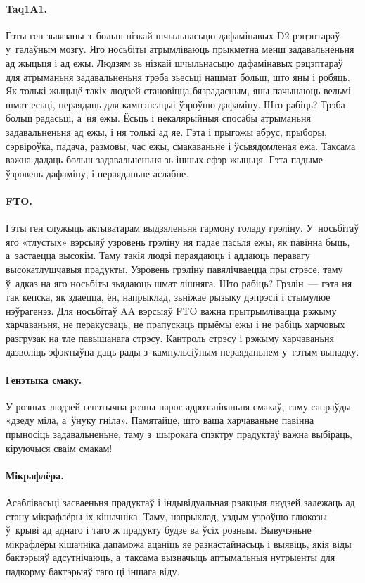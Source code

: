 \paragraph{Taq1A1.}
Гэты ген зьвязаны з~больш нізкай шчыльнасьцю дафамінавых D2 рэцэптараў у~галаўным мозгу. Яго носьбіты атрымліваюць прыкметна менш задавальненьня ад жыцьця і ад ежы. Людзям зь нізкай шчыльнасьцю дафамінавых рэцэптараў для атрыманьня задавальненьня трэба зьесьці нашмат больш, што яны і робяць. Як толькі жыцьцё такіх людзей становіцца бязрадасным, яны пачынаюць вельмі шмат есьці, пераядаць для кампэнсацыі ўзроўню дафаміну. Што рабіць? Трэба больш радасьці, а~ня ежы. Ёсьць і некалярыйныя спосабы атрыманьня задавальненьня ад ежы, і ня толькі ад яе. Гэта і прыгожы абрус, прыборы, сэрвіроўка, падача, размовы, час ежы, смакаваньне і ўсьвядомленая ежа. Таксама важна дадаць больш задавальненьня зь іншых сфэр жыцьця. Гэта падыме ўзровень дафаміну, і пераяданьне аслабне.

\paragraph{FTO.}
Гэты ген служыць актыватарам выдзяленьня гармону голаду грэліну. У~носьбітаў яго «тлустых» вэрсыяў узровень грэліну ня падае пасьля ежы, як павінна быць, а~застаецца высокім. Таму такія людзі пераядаюць і аддаюць перавагу высокатлушчавыя прадукты. Узровень грэліну павялічваецца пры стрэсе, таму ў~адказ на яго носьбіты зьядаюць шмат лішняга. Што рабіць? Грэлін~--- гэта ня так кепска, як здаецца, ён, напрыклад, зьніжае рызыку дэпрэсіі і стымулюе нэўрагенэз. Для носьбітаў AA вэрсыяў FTO важна прытрымлівацца рэжыму харчаваньня, не перакусваць, не прапускаць прыёмы ежы і не рабіць харчовых разгрузак на тле павышанага стрэсу. Кантроль стрэсу і рэжыму харчаваньня дазволіць эфэктыўна даць рады з~кампульсіўным пераяданьнем у~гэтым выпадку.

\paragraph{Генэтыка смаку.}
У розных людзей генэтычна розны парог адрозьніваньня смакаў, таму сапраўды «дзеду міла, а~ўнуку гніла». Памятайце, што ваша харчаваньне павінна прыносіць задавальненьне, таму з~шырокага спэктру прадуктаў важна выбіраць, кіруючыся сваім смакам!

\paragraph{Мікрафлёра.}
Асаблівасьці засваеньня прадуктаў і індывідуальная рэакцыя людзей залежаць ад стану мікрафлёры іх кішачніка. Таму, напрыклад, уздым узроўню глюкозы ў~крыві ад аднаго і таго ж прадукту будзе ва ўсіх розным. Вывучэньне мікрафлёры кішачніка дапаможа ацаніць яе разнастайнасьць і выявіць, якія віды бактэрыяў адсутнічаюць, а~таксама вызначыць аптымальныя нутрыенты для падкорму бактэрыяў таго ці іншага віду.

